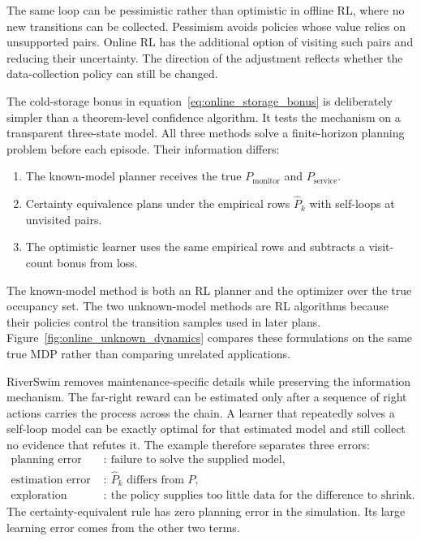 The same loop can be pessimistic rather than optimistic in offline RL, where no new transitions can be collected. Pessimism avoids policies whose value relies on unsupported pairs. Online RL has the additional option of visiting such pairs and reducing their uncertainty. The direction of the adjustment reflects whether the data-collection policy can still be changed.

The cold-storage bonus in equation~\eqref{eq:online_storage_bonus} is deliberately simpler than a theorem-level confidence algorithm. It tests the mechanism on a transparent three-state model. All three methods solve a finite-horizon planning problem before each episode. Their information differs:
\begin{enumerate}
\item The known-model planner receives the true $P_{\mathrm{monitor}}$ and $P_{\mathrm{service}}$.
\item Certainty equivalence plans under the empirical rows $\widehat P_k$ with self-loops at unvisited pairs.
\item The optimistic learner uses the same empirical rows and subtracts a visit-count bonus from loss.
\end{enumerate}
The known-model method is both an RL planner and the optimizer over the true occupancy set. The two unknown-model methods are RL algorithms because their policies control the transition samples used in later plans. Figure~\ref{fig:online_unknown_dynamics} compares these formulations on the same true MDP rather than comparing unrelated applications.

RiverSwim removes maintenance-specific details while preserving the information mechanism. The far-right reward can be estimated only after a sequence of right actions carries the process across the chain. A learner that repeatedly solves a self-loop model can be exactly optimal for that estimated model and still collect no evidence that refutes it. The example therefore separates three errors:
\begin{align*}
\text{planning error} &:\ \text{failure to solve the supplied model},\\
\text{estimation error} &:\ \widehat P_k\text{ differs from }P,\\
\text{exploration error} &:\ \text{the policy supplies too little data for the difference to shrink}.
\end{align*}
The certainty-equivalent rule has zero planning error in the simulation. Its large learning error comes from the other two terms.

